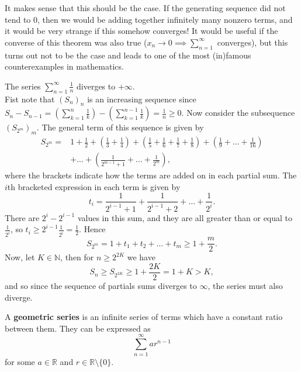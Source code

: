 \documentclass[../real_analysis.tex]{subfiles}
\begin{document}
        It makes sense that this should be the case. If the generating sequence did not tend to 0, then we would be adding together infinitely many nonzero terms, and it would be very strange if this somehow converges! It would be useful if the converse of this theorem was also true ($x_n\to0\implies\sum_{n=1}^\infty$ converges), but this turns out not to be the case and leads to one of the most (in)famous counterexamples in mathematics.
        \begin{example}
            The series $\sum_{n=1}^\infty\frac{1}{n}$ diverges to $+\infty$.\\
            Fist note that $(S_n)_n$ is an increasing sequence since $S_n-S_{n-1}=\left(\sum_{k=1}^n\frac{1}{k}\right)-\left(\sum_{k=1}^{n-1}\frac{1}{k}\right)=\frac{1}{n}\geq0$. Now consider the subsequence $(S_{2^m})_m$. The general term of this sequence is given by
            \begin{align*}
                S_{2^m}=&1+\frac{1}{2}+\left(\frac{1}{3}+\frac{1}{4}\right)+\left(\frac{1}{5}+\frac{1}{6}+\frac{1}{7}+\frac{1}{8}\right)+\left(\frac{1}{9}+\dots+\frac{1}{16}\right)\\
                &+\dots+\left(\frac{1}{2^{m-1}+1}+\dots+\frac{1}{2^m}\right),
            \end{align*}
            where the brackets indicate how the terms are added on in each partial sum. The $i$th bracketed expression in each term is given by
            \begin{equation*}
                t_i=\frac{1}{2^{i-1}+1}+\frac{1}{2^{i-1}+2}+\dots+\frac{1}{2^i}.
            \end{equation*}
            There are $2^i-2^{i-1}$ values in this sum, and they are all greater than or equal to $\frac{1}{2^i}$, so $t_i\geq2^{i-1}\frac{1}{2^i}=\frac{1}{2}$. Hence
            \begin{equation*}
                S_{2^m}=1+t_1+t_2+\dots+t_m\geq1+\frac{m}{2}.
            \end{equation*}
            Now, let $K\in\mathbb{N}$, then for $n\geq2^{2K}$ we have
            \begin{equation*}
                S_n\geq S_{2^{2K}}\geq 1+\frac{2K}{2}=1+K>K,
            \end{equation*}
            and so since the sequence of partials sums diverges to $\infty$, the series must also diverge.
        \end{example}
        \begin{definition}
            A \textbf{geometric series} is an infinite series of terms which have a constant ratio between them. They can be expressed as
            \begin{equation*}
                \sum_{n=1}^\infty ar^{n-1}
            \end{equation*}
            for some $a\in\mathbb{R}$ and $r\in\mathbb{R}\setminus\{0\}$.
        \end{definition}
\end{document}
